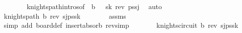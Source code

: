 \begin{isabellebody}
\ \ \ \ \ \ \isamarkupfalse%
\ knights{\isacharunderscore}{\kern0pt}path{\isachardot}{\kern0pt}intros{\isacharparenleft}{\kern0pt}{}{\isacharparenright}{\kern0pt}{\isacharbrackleft}{\kern0pt}of\ {\isachardoublequoteopen}{\isacharparenleft}{\kern0pt}{}{\isacharcomma}{\kern0pt}{}{\isacharparenright}{\kern0pt}{\isachardoublequoteclose}\ {\isachardoublequoteopen}{\isacharquery}{\kern0pt}b\ {\isacharminus}{\kern0pt}\ {\isacharbraceleft}{\kern0pt}{\isacharparenleft}{\kern0pt}{}{\isacharcomma}{\kern0pt}{}{\isacharparenright}{\kern0pt}{\isacharbraceright}{\kern0pt}{\isachardoublequoteclose}\ s\isactrlsub k\ {\isachardoublequoteopen}{\isacharparenleft}{\kern0pt}rev\ ps{\isacharprime}{\kern0pt}{\isacharparenright}{\kern0pt}{\isacharat}{\kern0pt}{\isacharbrackleft}{\kern0pt}s\isactrlsub j{\isacharbrackright}{\kern0pt}{\isachardoublequoteclose}{\isacharbrackright}{\kern0pt}\ \isamarkupfalse%
\ auto\isanewline
\ \ \ \ \isamarkupfalse%
\ \isamarkupfalse%
\ {\isachardoublequoteopen}knights{\isacharunderscore}{\kern0pt}path\ {\isacharquery}{\kern0pt}b\ {\isacharparenleft}{\kern0pt}{\isacharparenleft}{\kern0pt}{}{\isacharcomma}{\kern0pt}{}{\isacharparenright}{\kern0pt}{\isacharhash}{\kern0pt}rev\ {\isacharparenleft}{\kern0pt}s\isactrlsub j{\isacharhash}{\kern0pt}ps{\isacharprime}{\kern0pt}{\isacharat}{\kern0pt}{\isacharbrackleft}{\kern0pt}s\isactrlsub k{\isacharbrackright}{\kern0pt}{\isacharparenright}{\kern0pt}{\isacharparenright}{\kern0pt}{\isachardoublequoteclose}\isanewline
\ \ \ \ \ \ \isamarkupfalse%
\ assms\ \isamarkupfalse%
\ {\isacharparenleft}{\kern0pt}simp\ add{\isacharcolon}{\kern0pt}\ board{\isacharunderscore}{\kern0pt}def\ insert{\isacharunderscore}{\kern0pt}absorb\ rev{\isacharunderscore}{\kern0pt}simp{\isacharparenright}{\kern0pt}\isanewline
\ \ \ \ \isamarkupfalse%
\ \isamarkupfalse%
\ {\isachardoublequoteopen}knights{\isacharunderscore}{\kern0pt}circuit\ {\isacharquery}{\kern0pt}b\ {\isacharparenleft}{\kern0pt}{\isacharparenleft}{\kern0pt}{}{\isacharcomma}{\kern0pt}{}{\isacharparenright}{\kern0pt}{\isacharhash}{\kern0pt}rev\ {\isacharparenleft}{\kern0pt}s\isactrlsub j{\isacharhash}{\kern0pt}ps{\isacharprime}{\kern0pt}{\isacharat}{\kern0pt}{\isacharbrackleft}{\kern0pt}s\isactrlsub k{\isacharbrackright}{\kern0pt}{\isacharparenright}{\kern0pt}{\isacharparenright}{\kern0pt}{\isachardoublequoteclose}\isanewline
\ \ \ \ \ \ \isamarkupfalse%

\end{isabellebody}
